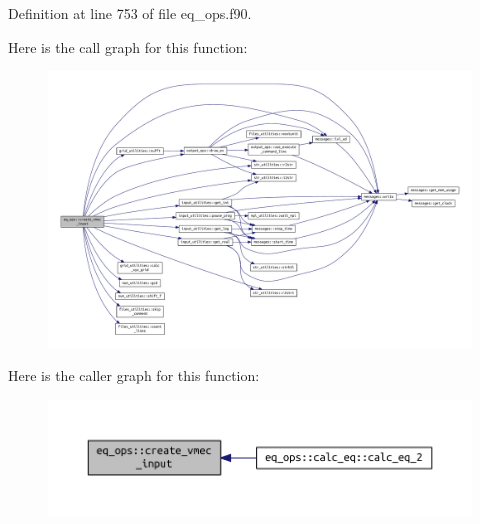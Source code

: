 Definition at line 753 of file eq\+\_\+ops.\+f90.

Here is the call graph for this function\+:\nopagebreak
\begin{figure}[H]
\begin{center}
\leavevmode
\includegraphics[width=350pt]{namespaceeq__ops_a9addef683b3d4a8c587510e4c994ec61_cgraph}
\end{center}
\end{figure}
Here is the caller graph for this function\+:\nopagebreak
\begin{figure}[H]
\begin{center}
\leavevmode
\includegraphics[width=350pt]{namespaceeq__ops_a9addef683b3d4a8c587510e4c994ec61_icgraph}
\end{center}
\end{figure}
\mbox{\label{namespaceeq__ops_ac0a79893900631d25b170be0abd2c131}} 
